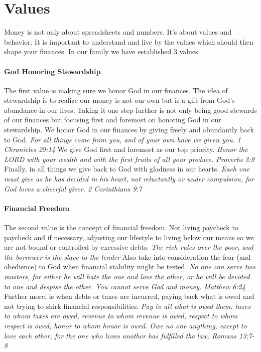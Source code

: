 \section*{Values}
Money is not only about spreadsheets and numbers. It's about values and behavior. It is important to understand and live by the values which should then shape your finances. In our family we have established 3 values.

\paragraph{God Honoring Stewardship} The first value is making sure we honor God in our finances. The idea of stewardship is to realize our money is not our own but is a gift from God's abundance in our lives. Taking it one step further is not only being good stewards of our finances but focusing first and foremost on honoring God in our stewardship. We honor God in our finances by giving freely and abundantly back to God. \textit{For all things come from you, and of your own have we given you. 1 Chronicles 29:14} We give God first and foremost as our top priority. \textit{Honor the LORD with your wealth and with the first fruits of all your produce. Proverbs 3:9} Finally, in all things we give back to God with gladness in our hearts. \textit{Each one must give as he has decided in his heart, not reluctantly or under compulsion, for God loves a cheerful giver. 2 Corinthians 9:7}

\paragraph{Financial Freedom} The second value is the concept of financial freedom. Not living paycheck to paycheck and if necessary, adjusting our lifestyle to living below our means so we are not bound or controlled by excessive debts. \textit{The rich rules over the poor, and the borrower is the slave to the lender} Also take into consideration the fear (and obedience) to God when financial stability might be tested. \textit{No one can serve two masters, for either he will hate the one and love the other, or he will be devoted to one and despise the other. You cannot serve God and money. Matthew 6:24} Further more, is when debts or taxes are incurred, paying back what is owed and not trying to shirk financial responsibilities. \textit{Pay to all what is owed them: taxes to whom taxes are owed, revenue to whom revenue is owed, respect to whom respect is owed, honor to whom honor is owed. Owe no one anything, except to love each other, for the one who loves another has fulfilled the law. Romans 13;7-8} 


